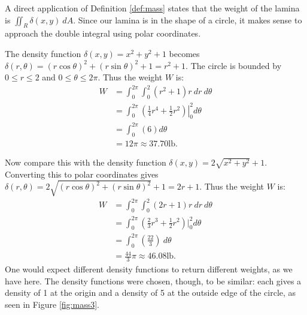 {A direct application of Definition \ref{def:mass} states that the weight of the lamina is $\iint_R\delta(x,y)\ dA$. Since our lamina is in the shape of a circle, it makes sense to approach the double integral using polar coordinates.

The density function $\delta(x,y) = x^2+y^2+1$ becomes $\delta(r,\theta) = (r\cos\theta)^2+(r\sin\theta)^2+1 = r^2+1$. The circle is bounded by $0\leq r\leq 2$ and $0\leq\theta\leq2\pi$. Thus the weight $W$ is:
\begin{align*}
W &= \int_0^{2\pi}\int_0^2 (r^2+1)r\ dr\ d\theta\\
	&= \int_0^{2\pi} \left.\left(\frac14r^4+\frac12r^2\right)\right|_0^2d\theta\\
	&= \int_0^{2\pi} \left(6\right) d\theta\\
	&= 12\pi \approx 37.70\text{lb}.
\end{align*}

Now compare this with the density function $\delta(x,y) = 2\sqrt{x^2+y^2}+1$. Converting this to polar coordinates gives $\delta(r,\theta) = 2\sqrt{(r\cos\theta)^2+(r\sin\theta)^2}+1 = 2r+1$. Thus the weight $W$ is:
\begin{align*}
W &= \int_0^{2\pi}\int_0^2 (2r+1)r\ dr\ d\theta\\
	&= \int_0^{2\pi} (\frac23r^3+\frac12r^2)\Big|_0^2d\theta\\
	&= \int_0^{2\pi} \left(\frac{22}3\right)\ d\theta\\
	&= \frac{44}3\pi \approx 46.08\text{lb}.
\end{align*}
One would expect different density functions to return different weights, as we have here. The density functions were chosen, though, to be similar: each gives a density of 1 at the origin and a density of 5 at the outside edge of the circle, as seen in Figure \ref{fig:mass3}.

}
